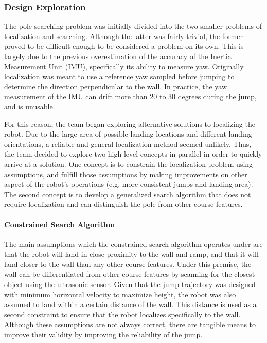 \documentclass[ece]{uw-wkrpt}
\begin{document}
\subsubsection{Design Exploration}

The pole searching problem was initially divided into the two smaller problems of localization and searching. Although the latter was fairly trivial, the former proved to be difficult enough to be considered a problem on its own. This is largely due to the previous overestimation of the accuracy of the Inertia Measurement Unit (IMU), specifically its ability to measure yaw. Originally  localization was meant to use a reference yaw sampled before jumping to determine the direction perpendicular to the wall. In practice, the yaw measurement of the IMU can drift more than 20 to 30 degrees during the jump, and is unusable. 

For this reason, the team began exploring alternative solutions to localizing the robot. Due to the large area of possible landing locations and different landing orientations, a reliable and general localization method seemed unlikely. Thus, the team decided to explore two high-level concepts in parallel in order to quickly arrive at a solution. One concept is to constrain the localization problem using assumptions, and fulfill those assumptions by making improvements on other aspect of the robot’s operations (e.g. more consistent jumps and landing area). The second concept is to develop a generalized search algorithm that does not require localization and can distinguish the pole from other course features. 

\paragraph{Constrained Search Algorithm}

The main assumptions which the constrained search algorithm operates under are that the robot will land in close proximity to the wall and ramp, and that it will land closer to the wall than any other course features. Under this premise, the wall can be differentiated from other course features by scanning for the closest object using the ultrasonic sensor. Given that the jump trajectory was designed with minimum horizontal velocity to maximize height, the robot was also assumed to land within a certain distance of the wall. This distance is used as a second constraint to ensure that the robot localizes specifically to the wall. Although these assumptions are not always correct, there are tangible means to improve their validity by improving the reliability of the jump.
\end{document}
